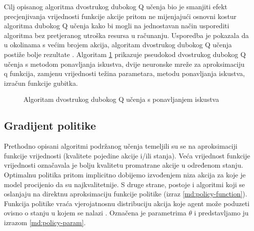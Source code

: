 Cilj opisanog algoritma dvostrukog dubokog Q učenja bio je smanjiti efekt precjenjivanja vrijednosti funkcije akcije pritom ne mijenjajući osnovni kostur algoritma dubokog Q učenja kako bi mogli na jednostavan način usporediti algoritma bez pretjeranog utroška resursa u računanju. Usporedba je pokazala da u okolinama s većim brojem akcija, algoritam dvostrukog dubokog Q učenja postiže bolje rezultate \cite{DDQL}. Algoritam \ref{fig:ddql-algorithm} prikazuje pseudokod dvostrukog dubokog Q učenja s metodom ponavljanja iskustva, dvije neuronske mreže za aproksimaciju q funkcija, zamjenu vrijednosti težina parametara, metodu ponavljanja iskustva, izračun funkcije gubitka. 

\begin{figure}[H]
    \centering
    \caption{Algoritam dvostrukog dubokog Q učenja s ponavljanjem iskustva}
    \label{fig:ddql-algorithm}
\end{figure}

\subsection{Gradijent politike}


Prethodno opisani algoritmi podržanog učenja temeljili su se na aproksimaciji funkcije vrijednosti (kvalitete  pojedine akcije i/ili stanja). Veća vrijednost funkcije vrijednosti označavala je bolju kvalitetu promatrane akcije u određenom stanju. Optimalnu politika pritom implicitno dobijemo izvođenjem niza akcija za koje je model procijenio da su najkvalitetnije. S druge strane, postoje i algoritmi koji se oslanjaju na direktnu aproksimaciju funkcije politike (izraz \ref{md:policy-function}). Funkcija politike vraća vjerojatnosnu distribuciju akcija koje agent može poduzeti ovisno o stanju u kojem se nalazi \cite{tensorflow}. Označena je parametrima $\theta$ i predstavljamo ju izrazom \ref{md:policy-param}.

